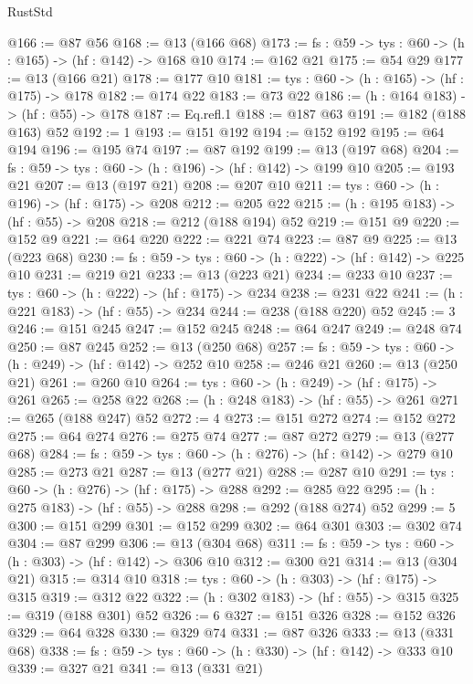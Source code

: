 \begin{lexlean}{RustStd}
\begin{coremodule}
@166 := @87 @56
@168 := @13 (@166 @68)
@173 := {fs : @59} -> {tys : @60} -> (h : @165) -> (hf : @142) -> @168 @10
@174 := @162 @21
@175 := @54 @29
@177 := @13 (@166 @21)
@178 := @177 @10
@181 := {tys : @60} -> (h : @165) -> (hf : @175) -> @178
@182 := @174 @22
@183 := @73 @22
@186 := (h : @164 @183) -> (hf : @55) -> @178
@187 := Eq.refl.{1}
@188 := @187 @63
@191 := @182 (@188 @163) @52
@192 := 1
@193 := @151 @192
@194 := @152 @192
@195 := @64 @194
@196 := @195 @74
@197 := @87 @192
@199 := @13 (@197 @68)
@204 := {fs : @59} -> {tys : @60} -> (h : @196) -> (hf : @142) -> @199 @10
@205 := @193 @21
@207 := @13 (@197 @21)
@208 := @207 @10
@211 := {tys : @60} -> (h : @196) -> (hf : @175) -> @208
@212 := @205 @22
@215 := (h : @195 @183) -> (hf : @55) -> @208
@218 := @212 (@188 @194) @52
@219 := @151 @9
@220 := @152 @9
@221 := @64 @220
@222 := @221 @74
@223 := @87 @9
@225 := @13 (@223 @68)
@230 := {fs : @59} -> {tys : @60} -> (h : @222) -> (hf : @142) -> @225 @10
@231 := @219 @21
@233 := @13 (@223 @21)
@234 := @233 @10
@237 := {tys : @60} -> (h : @222) -> (hf : @175) -> @234
@238 := @231 @22
@241 := (h : @221 @183) -> (hf : @55) -> @234
@244 := @238 (@188 @220) @52
@245 := 3
@246 := @151 @245
@247 := @152 @245
@248 := @64 @247
@249 := @248 @74
@250 := @87 @245
@252 := @13 (@250 @68)
@257 := {fs : @59} -> {tys : @60} -> (h : @249) -> (hf : @142) -> @252 @10
@258 := @246 @21
@260 := @13 (@250 @21)
@261 := @260 @10
@264 := {tys : @60} -> (h : @249) -> (hf : @175) -> @261
@265 := @258 @22
@268 := (h : @248 @183) -> (hf : @55) -> @261
@271 := @265 (@188 @247) @52
@272 := 4
@273 := @151 @272
@274 := @152 @272
@275 := @64 @274
@276 := @275 @74
@277 := @87 @272
@279 := @13 (@277 @68)
@284 := {fs : @59} -> {tys : @60} -> (h : @276) -> (hf : @142) -> @279 @10
@285 := @273 @21
@287 := @13 (@277 @21)
@288 := @287 @10
@291 := {tys : @60} -> (h : @276) -> (hf : @175) -> @288
@292 := @285 @22
@295 := (h : @275 @183) -> (hf : @55) -> @288
@298 := @292 (@188 @274) @52
@299 := 5
@300 := @151 @299
@301 := @152 @299
@302 := @64 @301
@303 := @302 @74
@304 := @87 @299
@306 := @13 (@304 @68)
@311 := {fs : @59} -> {tys : @60} -> (h : @303) -> (hf : @142) -> @306 @10
@312 := @300 @21
@314 := @13 (@304 @21)
@315 := @314 @10
@318 := {tys : @60} -> (h : @303) -> (hf : @175) -> @315
@319 := @312 @22
@322 := (h : @302 @183) -> (hf : @55) -> @315
@325 := @319 (@188 @301) @52
@326 := 6
@327 := @151 @326
@328 := @152 @326
@329 := @64 @328
@330 := @329 @74
@331 := @87 @326
@333 := @13 (@331 @68)
@338 := {fs : @59} -> {tys : @60} -> (h : @330) -> (hf : @142) -> @333 @10
@339 := @327 @21
@341 := @13 (@331 @21)

\end{coremodule}
\end{lexlean}
